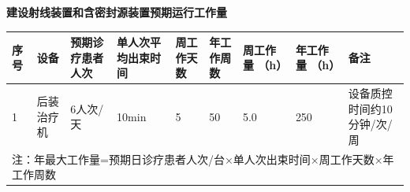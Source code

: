 \textbf{建设射线装置和含密封源装置预期运行工作量}

\vspace{10mm}
\begin{center}
\songti
\setlength{\tabrestwidth}{\dimexpr\textwidth - 2.0cm - 16\tabcolsep - 10\arrayrulewidth\relax}
\begin{tabular}{|p{2.0cm}|p{}|p{}|p{}|p{}|p{}|p{}|p{}|p{}|}
\hline
\raggedright 序号 & \raggedright 设备 & \raggedright 预期诊疗患者人次 & \raggedright 单人次平均出束时间 & \raggedright 周工作天数 & \raggedright 年工作周数 & \raggedright 周工作量 （h） & \raggedright 年工作量 （h） & \raggedright 备注 \\
\hline
\raggedright 1 & \raggedright 后装治疗机 & \raggedright 6人次/天 & \raggedright 10min & \raggedright 5 & \raggedright 50 & \raggedright 5.0 & \raggedright 250 & \raggedright 设备质控时间约10分钟/次/周 \\
\hline
\multicolumn{9}{|p{\dimexpr 2.0cm + \dimexpr\tabrestwidth*121/1000\relax + \dimexpr\tabrestwidth*202/1000\relax + \dimexpr\tabrestwidth*111/1000\relax + \dimexpr\tabrestwidth*115/1000\relax + \dimexpr\tabrestwidth*111/1000\relax + \dimexpr\tabrestwidth*87/1000\relax + \dimexpr\tabrestwidth*80/1000\relax + \dimexpr\tabrestwidth*172/1000\relax + 16\tabcolsep + 8\arrayrulewidth\relax}|}{\raggedright 注：年最大工作量=预期日诊疗患者人次/台×单人次出束时间×周工作天数×年工作周数} \\
\hline
\end{tabular}
\end{center}



